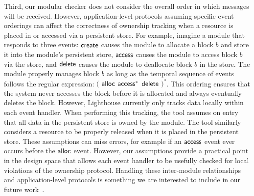 Third, our modular checker does not consider the overall order in
which messages will be received.  
%
However, application-level protocols assuming specific event orderings
can affect the correctness of ownership tracking when a resource is
placed in or accessed via a persistent store.
%
For example, imagine a module that responds to three events: ${\mathsf{create}}$
causes the module to allocate a block $b$ and store it into the
module's persistent store, ${\mathsf{access}}$ causes the module to access block
$b$ via the  store, and ${\mathsf{delete}}$ causes the module to deallocate
block $b$ in the store.  
%
The module properly manages block $b$ as long as the temporal sequence
of events follows the regular expression: $($ ${\mathsf{alloc}}$ ${\mathsf{access}}^*$
${\mathsf{delete}}$ $)^*$.  
%
This ordering ensures that the system never accesses the block before
it is allocated and always eventually deletes the block.
%
However, Lighthouse currently only tracks data locally within each
event handler.  
%
When performing this tracking, the tool assumes on entry that all data
in the persistent store is owned by the module.
%
The tool similarly considers a resource to be properly released when
it is placed in the persistent store.  
%
These assumptions can miss errors, for example if an ${\mathsf{access}}$ event
ever occurs before the ${\mathsf{alloc}}$ event.  
%
However, our assumptions provide a practical point in the design space
that allows each event handler to be usefully checked for local
violations of the ownership protocol.  
%
Handling these inter-module relationships and application-level
protocols is something we are interested to include in our future
work~\cite{AlurPOPL05,HJM05}.

